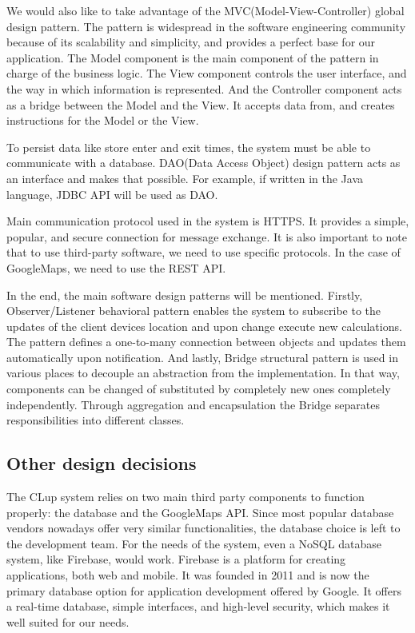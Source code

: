  

We would also like to take advantage of the MVC(Model-View-Controller) global design pattern. The pattern is widespread in the software engineering community because of its scalability and simplicity, and provides a perfect base for our application. The Model component is the main component of the pattern in charge of the business logic. The View component controls the user interface, and the way in which information is represented. And the Controller component acts as a bridge between the Model and the View. It accepts data from, and creates instructions for the Model or the View. \newline


To persist data like store enter and exit times, the system must be able to communicate with a database. DAO(Data Access Object) design pattern acts as an interface and makes that possible. For example, if written in the Java language, JDBC API will be used as DAO. 

 

Main communication protocol used in the system is HTTPS. It provides a simple, popular, and secure connection for message exchange. It is also important to note that to use third-party software, we need to use specific protocols. In the case of GoogleMaps, we need to use the REST API. \newline

 

In the end, the main software design patterns will be mentioned. Firstly, Observer/Listener behavioral pattern enables the system to subscribe to the updates of the client devices location and upon change execute new calculations. The pattern defines a one-to-many connection between objects and updates them automatically upon notification. And lastly, Bridge structural pattern is used in various places to decouple an abstraction from the implementation. In that way, components can be changed of substituted by completely new ones completely independently. Through aggregation and encapsulation the Bridge separates responsibilities into different classes. 
\newpage
\subsection{Other design decisions}
\hspace{\parindent}The CLup system relies on two main third party components to function properly: the database and the GoogleMaps API. Since most popular database vendors nowadays offer very similar functionalities, the database choice is left to the development team. For the needs of the system, even a NoSQL database system, like Firebase, would work. Firebase is a platform for creating applications, both web and mobile. It was founded in 2011 and is now the primary database option for application development offered by Google. It offers a real-time database, simple interfaces, and high-level security, which makes it well suited for our needs. \newline

